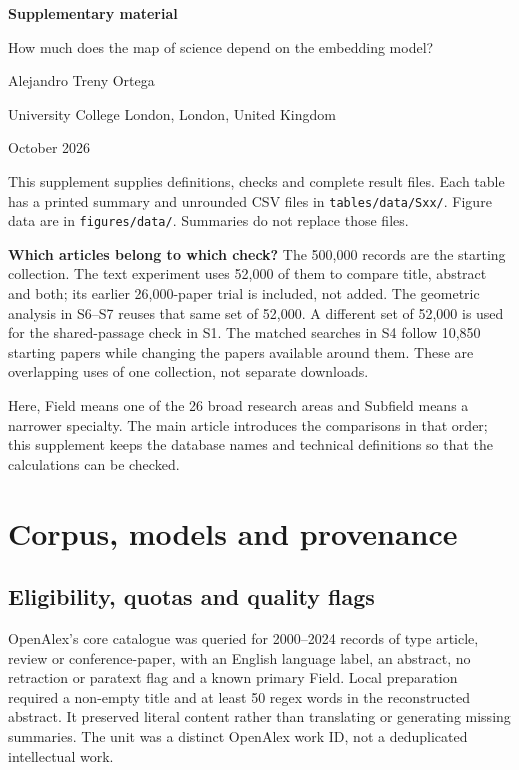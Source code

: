 \documentclass[12pt]{article}
\begin{document}
\begin{center}
{\LARGE\bfseries Supplementary material\par}
\medskip
{\large How much does the map of science depend on the embedding model?\par}
\medskip
Alejandro Treny Ortega\par
University College London, London, United Kingdom\par
{} October 2026
\end{center}

This supplement supplies definitions, checks and complete result files. Each table has a printed summary and unrounded CSV files in \nolinkurl{tables/data/Sxx/}. Figure data are in \nolinkurl{figures/data/}. Summaries do not replace those files.

\textbf{Which articles belong to which check?}
The 500,000 records are the starting collection. The text experiment uses 52,000 of them to compare title, abstract and both; its earlier 26,000-paper trial is included, not added. The geometric analysis in S6--S7 reuses that same set of 52,000. A different set of 52,000 is used for the shared-passage check in S1. The matched searches in S4 follow 10,850 starting papers while changing the papers available around them. These are overlapping uses of one collection, not separate downloads.

Here, Field means one of the 26 broad research areas and Subfield means a narrower specialty. The main article introduces the comparisons in that order; this supplement keeps the database names and technical definitions so that the calculations can be checked.

\medskip
{\small{}\setcounter{tocdepth}{1}\tableofcontents}
\clearpage

\section{Corpus, models and provenance}
\subsection{Eligibility, quotas and quality flags}
OpenAlex's core catalogue was queried for 2000--2024 records of type article, review or conference-paper, with an English language label, an abstract, no retraction or paratext flag and a known primary Field. Local preparation required a non-empty title and at least 50 regex words in the reconstructed abstract. It preserved literal content rather than translating or generating missing summaries. The unit was a distinct OpenAlex work ID, not a deduplicated intellectual work.
\end{document}
